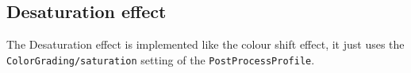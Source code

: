 \subsection{Desaturation effect}

\begin{sloppypar}
The Desaturation effect is implemented like the colour shift effect, it just uses the \texttt{ColorGrading/saturation} setting of the \texttt{PostProcessProfile}.
\end{sloppypar}
